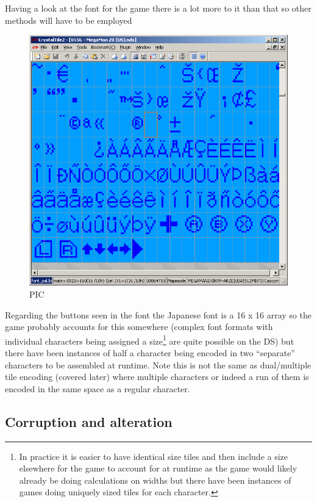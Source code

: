 \documentclass[
]{book}
\begin{document}
Having a look at the font for the game there is a lot more to it than that so other methods will have to be employed

\begin{figure}
\centering
\includegraphics{images/88_home_fast6191_romhackingguide_unrenamed_file___rs_romhackingguiderelativesearchfontviewing.png}
\caption{PIC}
\end{figure}

Regarding the buttons seen in the font the Japanese font is a 16 x 16 array so the game probably accounts for this somewhere (complex font formats with individual characters being assigned a size\footnote{In practice it is easier to have identical size tiles and then include a size elsewhere for the game to account for at runtime as the game would likely already be doing calculations on widths but there have been instances of games doing uniquely sized tiles for each character.} are quite possible on the DS) but there have been instances of half a character being encoded in two ``separate'' characters to be assembled at runtime. Note this is not the same as dual/multiple tile encoding (covered later) where multiple characters or indeed a run of them is encoded in the same space as a regular character.

\hypertarget{corruption-and-alteration}{%
\subsection{Corruption and alteration}\label{corruption-and-alteration}}
\end{document}
